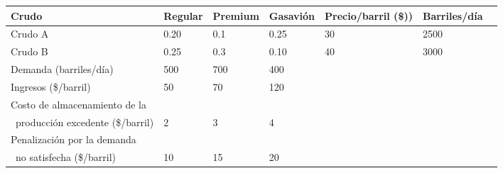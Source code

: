 \begin{table}[H]
\begin{small}
\begin{tabular}{lllllll}
\hline
Crudo                            & Regular & Premium & Gasavión & Precio/barril (\$)) & Barriles/día &  \\
\hline
Crudo A                          & 0.20     & 0.1      & 0.25      & 30                  & 2500         &  \\
Crudo B                          & 0.25     & 0.3      & 0.10      & 40                  & 3000         &  \\
Demanda (barriles/día)           & 500     & 700     & 400      &                     &              &  \\
Ingresos (\$/barril)             & 50      & 70      & 120      &                     &              &  \\
Costo de almacenamiento de la    &         &         &          &                     &              &  \\
\, producción excedente (\$/barril) & 2       & 3       & 4        &                     &              &  \\
Penalización por la demanda      &         &         &          &                     &              &  \\
\, no satisfecha (\$/barril)        & 10      & 15      & 20       &                     &              & \\
\hline
\end{tabular}
\end{small}
\label{tabla:3}
\end{table}
